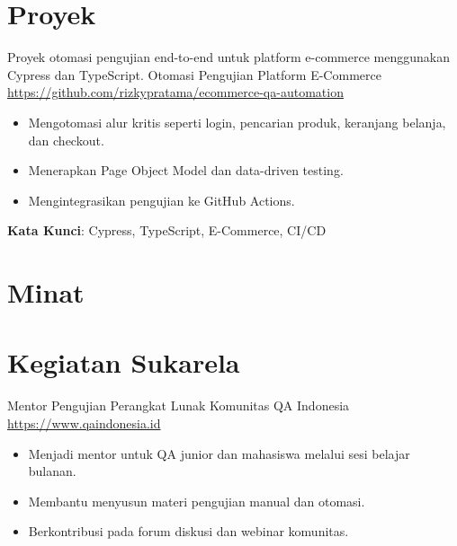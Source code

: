 \documentclass[a4paper, serif, 10pt]{moderncv}
\begin{document}
\section{Proyek}

        {Proyek otomasi pengujian end-to-end untuk platform e-commerce menggunakan Cypress dan TypeScript.}
        {Otomasi Pengujian Platform E-Commerce}
        {\url{https://github.com/rizkypratama/ecommerce-qa-automation}}
        {}
        {\begin{itemize}
\item Mengotomasi alur kritis seperti login, pencarian produk, keranjang belanja, dan checkout.
\item Menerapkan Page Object Model dan data-driven testing.
\item Mengintegrasikan pengujian ke GitHub Actions.
\end{itemize}
\textbf{Kata Kunci}: Cypress, TypeScript, E-Commerce, CI/CD}
\section{Minat}

\section{Kegiatan Sukarela}

        {Mentor Pengujian Perangkat Lunak}
        {Komunitas QA Indonesia}
        {\url{https://www.qaindonesia.id}}
        {}
        {\begin{itemize}
\item Menjadi mentor untuk QA junior dan mahasiswa melalui sesi belajar bulanan.
\item Membantu menyusun materi pengujian manual dan otomasi.
\item Berkontribusi pada forum diskusi dan webinar komunitas.
\end{itemize}}
    
\end{document}
